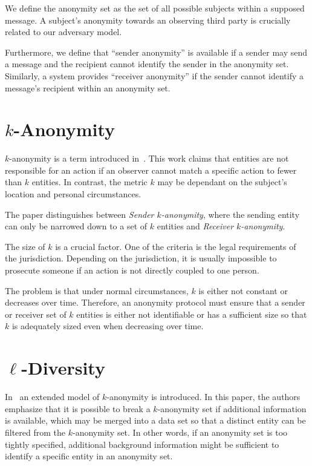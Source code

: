 We define the anonymity set as the set of all possible subjects within a supposed message. A subject's anonymity towards an observing third party is crucially related to our adversary model.

Furthermore, we define that ``sender anonymity'' is available if a sender may send a message and the recipient cannot identify the sender in the anonymity set. Similarly, a system provides ``receiver anonymity'' if the sender cannot identify a message's recipient within an anonymity set.

\section{\texorpdfstring{$k$}{k}-Anonymity}
$k$-anonymity is a term introduced in~\cite{k-anonymous:ccs2003}. This work claims that entities are not responsible for an action if an observer cannot match a specific action to fewer than $k$ entities. In contrast, the metric $k$ may be dependant on the subject's location and personal circumstances.

The paper distinguishes between \textit{Sender $k$-anonymity}, where the sending entity can only be narrowed down to a set of $k$ entities and \textit{Receiver $k$-anonymity}. 

The size of $k$ is a crucial factor. One of the criteria is the legal requirements of the jurisdiction. Depending on the jurisdiction, it is usually impossible to prosecute someone if an action is not directly coupled to one person. 

The problem is that under normal circumstances, $k$ is either not constant or decreases over time. Therefore, an anonymity protocol must ensure that a sender or receiver set of $k$ entities is either not identifiable or has a sufficient size so that $k$ is adequately sized even when decreasing over time.

\section{\texorpdfstring{$\ell$}{l}-Diversity}
In~\cite{machanavajjhala2007diversity} an extended model of $k$-anonymity is introduced. In this paper, the authors emphasize that it is possible to break a $k$-anonymity set if additional information is available, which may be merged into a data set so that a distinct entity can be filtered from the $k$-anonymity set. In other words, if an anonymity set is too tightly specified, additional background information might be sufficient to identify a specific entity in an anonymity set.

